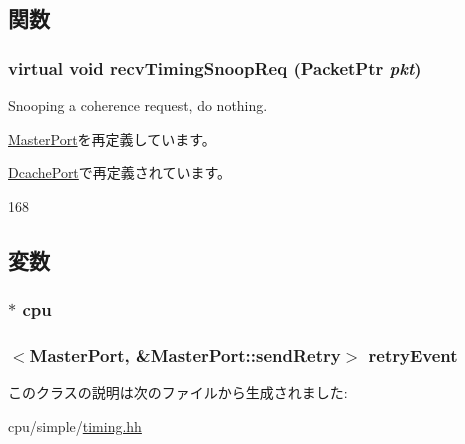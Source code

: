 \subsection{関数}
\hypertarget{classTimingSimpleCPU_1_1TimingCPUPort_ae43c73eff109f907118829fcfa9e7096}{
\subsubsection[{recvTimingSnoopReq}]{\setlength{\rightskip}{0pt plus 5cm}virtual void recvTimingSnoopReq ({\bf PacketPtr} {\em pkt})}}
\label{classTimingSimpleCPU_1_1TimingCPUPort_ae43c73eff109f907118829fcfa9e7096}
Snooping a coherence request, do nothing. 

\hyperlink{classMasterPort_ae43c73eff109f907118829fcfa9e7096}{MasterPort}を再定義しています。

\hyperlink{classTimingSimpleCPU_1_1DcachePort_aff3031c56fc4947a19695c868bb8233e}{DcachePort}で再定義されています。


\begin{DoxyCode}
168 {}
\end{DoxyCode}


\subsection{変数}
\hypertarget{classTimingSimpleCPU_1_1TimingCPUPort_ace3e131319475077fac2fa861708b0c9}{
\subsubsection[{cpu}]{$\ast$ {\bf cpu}}}
\label{classTimingSimpleCPU_1_1TimingCPUPort_ace3e131319475077fac2fa861708b0c9}
\hypertarget{classTimingSimpleCPU_1_1TimingCPUPort_a4afea62519871edec5a95131972c4952}{
\subsubsection[{retryEvent}]{$<${\bf MasterPort}, \&MasterPort::sendRetry$>$ {\bf retryEvent}}}
\label{classTimingSimpleCPU_1_1TimingCPUPort_a4afea62519871edec5a95131972c4952}


このクラスの説明は次のファイルから生成されました:\begin{DoxyCompactItemize}
\item 
cpu/simple/\hyperlink{timing_8hh}{timing.hh}\end{DoxyCompactItemize}
